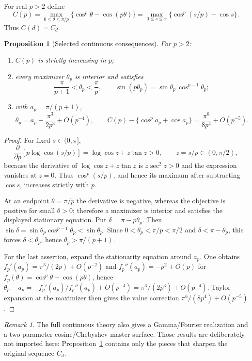 \documentclass[11pt]{article}
\newtheorem{proposition}[theorem]{Proposition}
\theoremstyle{definition}\newtheorem{definition}[theorem]{Definition}
\theoremstyle{remark}\newtheorem{remark}[theorem]{Remark}
\begin{document}
For real $p>2$ define
\[
C(p)=\max_{0\le\theta\le\pi/p}\{\cos^p\theta-\cos(p\theta)\}
=\max_{0\le s\le\pi}\{\cos^p(s/p)-\cos s\}.
\]
Thus $C(d)=C_d$.

\begin{proposition}[Selected continuous consequences]\label{prop:continuous}
For $p>2$:
\begin{enumerate}
\item $C(p)$ is strictly increasing in $p$;
\item every maximizer $\theta_p$ is interior and satisfies
\[
\frac{\pi}{p+1}<\theta_p<\frac\pi p,
\qquad
\sin(p\theta_p)=\sin\theta_p\,\cos^{p-1}\theta_p;
\]
\item with $a_p=\pi/(p+1)$,
\[
\theta_p=a_p+\frac{\pi^3}{2p^3}+O(p^{-4}),\qquad
C(p)-\{\cos^pa_p+\cos a_p\}=\frac{\pi^6}{8p^4}+O(p^{-5}).
\]
\end{enumerate}
\end{proposition}
\begin{proof}
For fixed $s\in(0,\pi]$,
\[
\frac{\partial}{\partial p}\left[p\log\cos(s/p)\right]
=\log\cos z+z\tan z>0,\qquad z=s/p\in(0,\pi/2),
\]
because the derivative of $\log\cos z+z\tan z$ is $z\sec^2z>0$ and the expression vanishes at $z=0$.
Thus $\cos^p(s/p)$, and hence its maximum after subtracting $\cos s$, increases strictly with $p$.

At an endpoint $\theta=\pi/p$ the derivative is negative, whereas the objective is positive for small $\theta>0$;
therefore a maximizer is interior and satisfies the displayed stationary equation. Put
$\delta=\pi-p\theta_p$. Then
$\sin\delta=\sin\theta_p\cos^{p-1}\theta_p<\sin\theta_p$. Since
$0<\theta_p<\pi/p<\pi/2$ and $\delta<\pi-\theta_p$, this forces $\delta<\theta_p$, hence
$\theta_p>\pi/(p+1)$.

For the last assertion, expand the stationarity equation around $a_p$. One obtains
$f_p'(a_p)=\pi^3/(2p)+O(p^{-2})$ and $f_p''(a_p)=-p^2+O(p)$ for
$f_p(\theta)=\cos^p\theta-\cos(p\theta)$, hence
$\theta_p-a_p=-f_p'(a_p)/f_p''(a_p)+O(p^{-4})=\pi^3/(2p^3)+O(p^{-4})$.
Taylor expansion at the maximizer then gives the value correction $\pi^6/(8p^4)+O(p^{-5})$.
\end{proof}

\begin{remark}
The full continuous theory also gives a Gamma/Fourier realization and a two-parameter cosine/Chebyshev master
surface. Those results are deliberately not imported here: Proposition~\ref{prop:continuous} contains only the pieces
that sharpen the original sequence $C_d$.
\end{remark}
\end{document}
